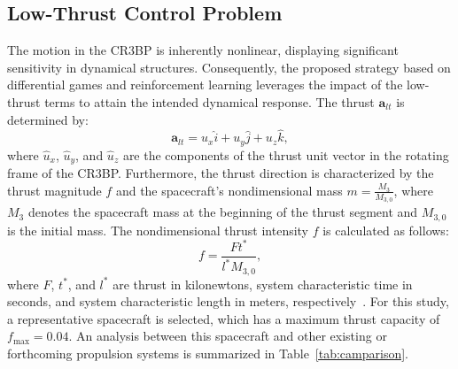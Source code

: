 \documentclass[conference]{IEEEtran}
\begin{document}
\subsection{Low-Thrust Control Problem}
The motion in the CR3BP is inherently nonlinear, displaying significant sensitivity in dynamical structures. Consequently, the proposed strategy based on differential games and reinforcement learning leverages the impact of the low-thrust terms to attain the intended dynamical response. The thrust \(\mathbf{a}_{lt}\) is determined by:
\begin{equation}
\mathbf{a}_{lt} =  {u}_x \hat{i} + {u}_y \hat{j} + {u}_z \hat{k},
\end{equation}
where \( \hat{u}_x \), \( \hat{u}_y \), and \( \hat{u}_z \) are the components of the thrust unit vector in the rotating frame of the CR3BP. Furthermore, the thrust direction is characterized by the thrust magnitude \( f \) and the spacecraft's nondimensional mass \( m = \frac{M_3}{M_{3,0}} \), where \( M_3 \) denotes the spacecraft mass at the beginning of the thrust segment and \( M_{3,0} \) is the initial mass.
The nondimensional thrust intensity \( f \) is calculated as follows:
\begin{equation}
f = \dfrac{Ft^*}{l^* M_{3,0}},
\end{equation}
where \( F \), \(t^*\), and \(l^*\) are thrust in kilonewtons, system characteristic time in seconds, and system characteristic length in meters, respectively~\cite{lafarge}.
For this study, a representative spacecraft is selected, which has a maximum thrust capacity of \( f_{\text{max}} = 0.04 \). An analysis between this spacecraft and other existing or forthcoming propulsion systems is summarized in Table~\ref{tab:camparison}.
\end{document}
